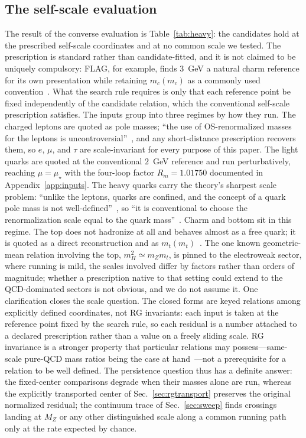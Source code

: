 \documentclass[aps,twocolumn,superscriptaddress,nofootinbib,floatfix]{revtex4-2}
\newcommand{\mstar}{\mu_\star}
\begin{document}
\subsection{The self-scale evaluation}
\label{sec:scalegrouping}

The result of the converse evaluation is Table~\ref{tab:heavy}: the candidates hold at the prescribed self-scale coordinates and at no common scale we tested. The prescription is standard rather than candidate-fitted, and it is not claimed to be uniquely compulsory: FLAG, for example, finds $3$~GeV a natural charm reference for its own presentation while retaining $m_c(m_c)$ as a commonly used convention~\cite{FLAG2024}. What the search rule requires is only that each reference point be fixed independently of the candidate relation, which the conventional self-scale prescription satisfies. The inputs group into three regimes by how they run. The charged leptons are quoted as pole masses; ``the use of OS-renormalized masses for the leptons is uncontroversial''~\cite{PDG2026}, and any short-distance prescription recovers them, so $e$, $\mu$, and $\tau$ are scale-invariant for every purpose of this paper. The light quarks are quoted at the conventional $2$~GeV reference and run perturbatively, reaching $\mu=\mstar$ with the four-loop factor $R_m=1.01750$ documented in Appendix~\ref{app:inputs}. The heavy quarks carry the theory's sharpest scale problem: ``unlike the leptons, quarks are confined, and the concept of a quark pole mass is not well-defined''~\cite{PDG2026}, so ``it is conventional to choose the renormalization scale equal to the quark mass''~\cite{PDG2026}. Charm and bottom sit in this regime. The top does not hadronize at all and behaves almost as a free quark; it is quoted as a direct reconstruction and as $m_t(m_t)$~\cite{PDG2026}. The one known geometric-mean relation involving the top, $m_H^2\simeq m_Zm_t$, is pinned to the electroweak sector, where running is mild, the scales involved differ by factors rather than orders of magnitude; whether a prescription native to that setting could extend to the QCD-dominated sectors is not obvious, and we do not assume it. One clarification closes the scale question. The closed forms are keyed relations among explicitly defined coordinates, not RG invariants: each input is taken at the reference point fixed by the search rule, so each residual is a number attached to a declared prescription rather than a value on a freely sliding scale. RG invariance is a stronger property that particular relations may possess---same-scale pure-QCD mass ratios being the case at hand~\cite{GasserLeutwyler1982,PDG2026}---not a prerequisite for a relation to be well defined. The persistence question thus has a definite answer: the fixed-center comparisons degrade when their masses alone are run, whereas the explicitly transported center of Sec.~\ref{sec:rgtransport} preserves the original normalized residual; the continuum trace of Sec.~\ref{sec:sweep} finds crossings landing at $M_Z$ or any other distinguished scale along a common running path only at the rate expected by chance.
\end{document}
